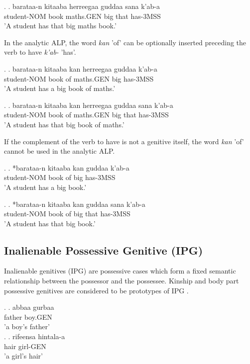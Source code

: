\documentclass[11pt,a4paper]{article}
\begin{document}
	\ex.
	\ag.
	barataa-n kitaaba herreegaa guddaa sana k'ab-a\\
	student-NOM book maths.GEN big that has-3MSS\\
	'A student has that big maths book.'
	
	In the analytic ALP, the word \emph{kan} 'of' can be optionally inserted preceding the verb to have \emph{k'ab-} 'has'.
	
	\ex.
	\ag.
	barataa-n kitaaba kan herreegaa guddaa k'ab-a\\
	student-NOM book of maths.GEN big has-3MSS\\
	'A student has a big book of maths.'
	
	\ex.
	\ag.
	barataa-n kitaaba kan herreegaa guddaa sana k'ab-a\\
	student-NOM book of maths.GEN big that has-3MSS\\
	'A student has that big book of maths.'
	
	If the complement of the verb to have is not a genitive itself, the word \emph{kan} 'of' cannot be used in the analytic ALP.
	
	\ex.
	\ag.
	*barataa-n kitaaba kan guddaa k'ab-a\\
	student-NOM book of big has-3MSS\\
	'A student has a big book.'
	
	\ex.
	\ag.
	*barataa-n kitaaba kan guddaa sana k'ab-a\\
	student-NOM book of big that has-3MSS\\
	'A student has that big book.'
	
	
	\subsection{Inalienable Possessive Genitive (IPG)}
	
	Inalienable genitives (IPG) are possessive cases which form a fixed semantic relationship between the possessor and the  possessee. Kinship and body part possessive genitives are considered to be prototypes of IPG \cite[161]{gebregziabher2012alienable}. 
	
	\ex.
	\ag.
	abbaa gurbaa\\
	father boy.GEN\\
	'a boy's father'\\
	
	\ex.
	\ag.
	rifeensa hintala-a\\
	hair girl-GEN\\
	'a girl's hair'\\
	
\end{document}
